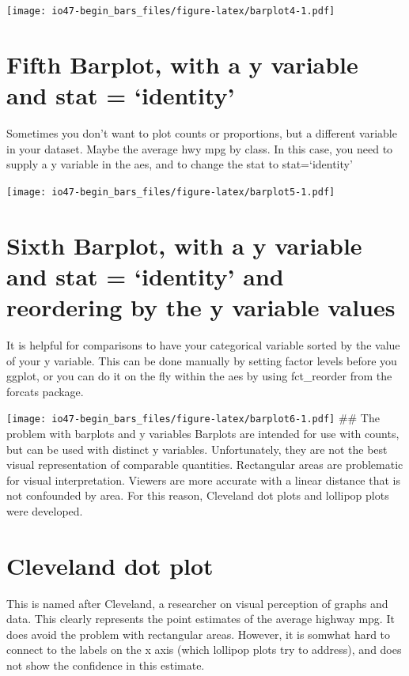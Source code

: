 \documentclass[
]{book}
\begin{document}
\texttt{[image: io47-begin\_bars\_files/figure-latex/barplot4-1.pdf]}

\hypertarget{fifth-barplot-with-a-y-variable-and-stat-identity}{%
\section{Fifth Barplot, with a y variable and stat = `identity'}\label{fifth-barplot-with-a-y-variable-and-stat-identity}}

Sometimes you don't want to plot counts or proportions, but a different variable in your dataset. Maybe the average hwy mpg by class. In this case, you need to supply a y variable in the aes, and to change the stat to stat=`identity'

\texttt{[image: io47-begin\_bars\_files/figure-latex/barplot5-1.pdf]}

\hypertarget{sixth-barplot-with-a-y-variable-and-stat-identity-and-reordering-by-the-y-variable-values}{%
\section{Sixth Barplot, with a y variable and stat = `identity' and reordering by the y variable values}\label{sixth-barplot-with-a-y-variable-and-stat-identity-and-reordering-by-the-y-variable-values}}

It is helpful for comparisons to have your categorical variable sorted by the value of your y variable. This can be done manually by setting factor levels before you ggplot, or you can do it on the fly within the aes by using fct\_reorder from the forcats package.

\texttt{[image: io47-begin\_bars\_files/figure-latex/barplot6-1.pdf]}
\#\# The problem with barplots and y variables
Barplots are intended for use with counts, but can be used with distinct y variables. Unfortunately, they are not the best visual representation of comparable quantities. Rectangular areas are problematic for visual interpretation. Viewers are more accurate with a linear distance that is not confounded by area.
For this reason, Cleveland dot plots and lollipop plots were developed.

\hypertarget{cleveland-dot-plot}{%
\section{Cleveland dot plot}\label{cleveland-dot-plot}}

This is named after Cleveland, a researcher on visual perception of graphs and data.
This clearly represents the point estimates of the average highway mpg. It does avoid the problem with rectangular areas. However, it is somwhat hard to connect to the labels on the x axis (which lollipop plots try to address), and does not show the confidence in this estimate.
\end{document}
